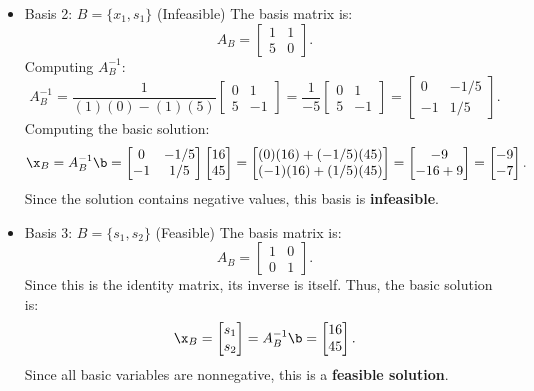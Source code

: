 \begin{itemize}
\item  Basis 2: \(B= \{x_1, s_1\} \) (Infeasible)
The basis matrix is:
\[
A_B =
\begin{bmatrix}
    1 & 1 \\
    5 & 0
\end{bmatrix}.
\]
Computing \( A_B^{-1} \):
\[
A_B^{-1} =
\frac{1}{(1)(0) - (1)(5)}
\begin{bmatrix}
    0 & 1 \\
    5 & -1
\end{bmatrix}
=
\frac{1}{-5}
\begin{bmatrix}
    0 & 1 \\
    5 & -1
\end{bmatrix}
=
\begin{bmatrix}
    0 & -1/5 \\
    -1 & 1/5
\end{bmatrix}.
\]
Computing the basic solution:
\[
\x_B = A_B^{-1}\b=
\begin{bmatrix}
    0 & -1/5 \\
    -1 & 1/5
\end{bmatrix}
\begin{bmatrix}
    16 \\ 45
\end{bmatrix}
=
\begin{bmatrix}
    (0)(16) + (-1/5)(45) \\
    (-1)(16) + (1/5)(45)
\end{bmatrix}
=
\begin{bmatrix}
    -9 \\
    -16 + 9
\end{bmatrix}
=
\begin{bmatrix}
    -9 \\ -7
\end{bmatrix}.
\]
Since the solution contains negative values, this basis is \textbf{infeasible}.

\item  Basis 3: \(B= \{s_1, s_2\} \) (Feasible)
The basis matrix is:
\[
A_B =
\begin{bmatrix}
    1 & 0 \\
    0 & 1
\end{bmatrix}.
\]
Since this is the identity matrix, its inverse is itself. Thus, the basic solution is:
\[
\x_B = \begin{bmatrix} s_1 \\ s_2 \end{bmatrix} = A_B^{-1}\b=
\begin{bmatrix}
    16 \\ 45
\end{bmatrix}.
\]
Since all basic variables are nonnegative, this is a \textbf{feasible solution}.
\end{itemize}


